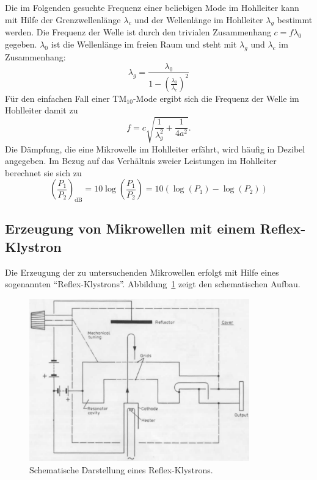 Die im Folgenden gesuchte Frequenz einer beliebigen Mode im Hohlleiter kann mit Hilfe der Grenzwellenlänge $\lambda_c$ und der Wellenlänge im Hohlleiter $\lambda_g$ bestimmt werden.
Die Frequenz der Welle ist durch den trivialen Zusammenhang $c=f\lambda_0$ gegeben.
$\lambda_0$ ist die Wellenlänge im freien Raum und steht mit $\lambda_g$ und $\lambda_c$ im Zusammenhang:
%
\begin{equation}
	\lambda_g=\frac{\lambda_0}{1-\left(\frac{\lambda_0}{\lambda_c}\right)^2}
\end{equation}
%
Für den einfachen Fall einer $\text{TM}_{10}$-Mode ergibt sich die Frequenz der Welle im Hohlleiter damit zu
%
\begin{equation}
	f=c\sqrt{\frac{1}{\lambda_g^2}+\frac{1}{4a^2}}.
	\label{eq:frequenz}
\end{equation}
%
Die Dämpfung, die eine Mikrowelle im Hohlleiter erfährt, wird häufig in Dezibel angegeben.
Im Bezug auf das Verhältnis zweier Leistungen im Hohlleiter berechnet sie sich zu
%
\begin{equation}
	\left(\frac{P_1}{P_2}\right)_{\text{dB}}=10\log\left(\frac{P_1}{P_2}\right)=10\left(\log(P_1)-\log(P_2)\right)
	\label{eq:daempfung}
\end{equation}

\subsection{Erzeugung von Mikrowellen mit einem Reflex-Klystron}

Die Erzeugung der zu untersuchenden Mikrowellen erfolgt mit Hilfe eines sogenannten \enquote{Reflex-Klystrons}.
Abbildung~\ref{fig:reflexklystron} zeigt den schematischen Aufbau.

\begin{figure}
    \centering
    \includegraphics[width=0.85\textwidth]{figure/reflex-klystron.png}
    \caption{Schematische Darstellung eines Reflex-Klystrons.\cite{V53}}
    \label{fig:reflexklystron}
\end{figure}


